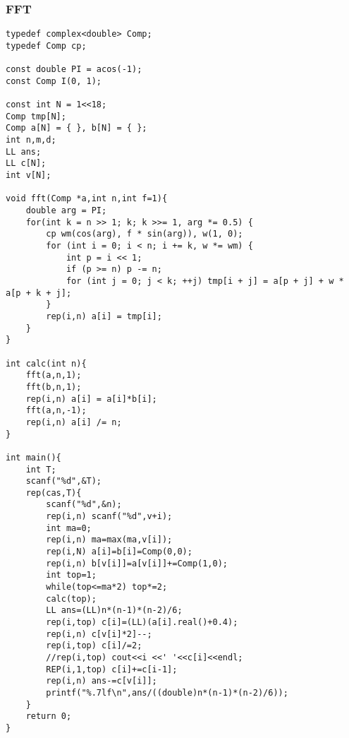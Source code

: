 \subsubsection{FFT}
\begin{verbatim}
typedef complex<double> Comp;
typedef Comp cp;

const double PI = acos(-1);
const Comp I(0, 1);

const int N = 1<<18;
Comp tmp[N];
Comp a[N] = { }, b[N] = { };
int n,m,d;
LL ans;
LL c[N];
int v[N];

void fft(Comp *a,int n,int f=1){
    double arg = PI;
    for(int k = n >> 1; k; k >>= 1, arg *= 0.5) {
        cp wm(cos(arg), f * sin(arg)), w(1, 0);
        for (int i = 0; i < n; i += k, w *= wm) {
            int p = i << 1;
            if (p >= n) p -= n;
            for (int j = 0; j < k; ++j) tmp[i + j] = a[p + j] + w * a[p + k + j];
        }
        rep(i,n) a[i] = tmp[i];
    }
}

int calc(int n){
    fft(a,n,1);
    fft(b,n,1);
    rep(i,n) a[i] = a[i]*b[i];
    fft(a,n,-1);
    rep(i,n) a[i] /= n;
}

int main(){
    int T;
    scanf("%d",&T);
    rep(cas,T){
        scanf("%d",&n);
        rep(i,n) scanf("%d",v+i);
        int ma=0;
        rep(i,n) ma=max(ma,v[i]);
        rep(i,N) a[i]=b[i]=Comp(0,0);
        rep(i,n) b[v[i]]=a[v[i]]+=Comp(1,0);
        int top=1;
        while(top<=ma*2) top*=2;
        calc(top);
        LL ans=(LL)n*(n-1)*(n-2)/6;
        rep(i,top) c[i]=(LL)(a[i].real()+0.4);
        rep(i,n) c[v[i]*2]--;
        rep(i,top) c[i]/=2;
        //rep(i,top) cout<<i <<' '<<c[i]<<endl;
        REP(i,1,top) c[i]+=c[i-1];
        rep(i,n) ans-=c[v[i]];
        printf("%.7lf\n",ans/((double)n*(n-1)*(n-2)/6));
    }
    return 0;
}
\end{verbatim}

